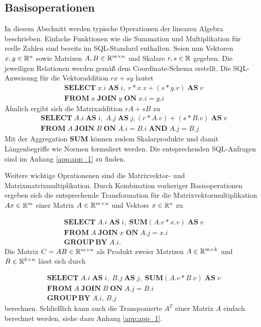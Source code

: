 \subsection*{Basisoperationen}
\label{abs_basisoperationen}
In diesem Abschnitt werden typische Operationen der linearen Algebra beschrieben. Einfache Funktionen wie die Summation und Multiplikation für reelle Zahlen sind bereits im SQL-Standard\cite{DBLP:books/daglib/0067064} enthalten. Seien nun Vektoren $x,y \in \mathbb{R}^n$ sowie Matrizen $A,B \in \mathbb{R}^{m \times n}$ und Skalare $r,s \in \mathbb{R}$ gegeben. Die jeweiligen Relationen werden gemäß dem Coordinate-Schema erstellt. Die SQL-Anweisung für die Vektoraddition $rx+sy$ lautet
\begin{align*}
    & \mathbf{SELECT} \; x.i \; \mathbf{AS} \; i, \; r*x.v+(s*y.v ) \; \mathbf{AS} \; v \\
    & \mathbf{FROM} \; x \; \mathbf{JOIN} \; y \; \mathbf{ON} \; x.i=y.i
\end{align*}
Ähnlich ergibt sich die Matrixaddition $rA+sB$ zu
\begin{align*}
    & \mathbf{SELECT} \; A.i \; \mathbf{AS} \; i, \; A.j \; \mathbf{AS} \; j, (r*A.v)+(s*B.v ) \; \mathbf{AS} \; v \\
    & \mathbf{FROM} \; A \; \mathbf{JOIN} \; B \; \mathbf{ON} \; A.i=B.i \; \mathbf{AND} \; A.j=B.j
\end{align*} 
Mit der Aggregation \textbf{SUM} können zudem Skalarprodukte und damit Längenbegriffe wie Normen formuliert werden. Die entsprechenden SQL-Anfragen sind im Anhang \ref{app:app_1} zu finden. 

Weitere wichtige Oprationenen sind die Matrixvektor- und Matrixmatrixmultiplikation. 
Durch Kombination vorheriger Basisoperationen ergeben sich die entsprechende Transformation für die Matrixvektormultiplikation $Ax \in \mathbb{R}^m$ einer Matrix $A \in \mathbb{R}^{m \times n}$ und Vektors $x \in \mathbb{R}^n$ zu

\begin{align*}
    & \mathbf{SELECT} \; A.i \; \mathbf{AS} \; i, \; \mathbf{SUM} (A.v*x.v) \; \mathbf{AS} \; v\\
    & \mathbf{FROM} \; A \; \mathbf{JOIN} \; x \; \mathbf{ON} \; A.j=x.i \; \\
    & \mathbf{GROUP} \, \mathbf{BY} \; A.i.
\end{align*}
Die Matrix $C=AB \in \mathbb{R}^{m \times n}$ als Produkt zweier Matrizen $A \in \mathbb{R}^{m \times k}$ und $B \in \mathbb{R}^{k \times n}$ lässt sich durch

\begin{align*}
    & \mathbf{SELECT} \; A.i \; \mathbf{AS} \; i, \; B.j \; \mathbf{AS} \; j, \; \mathbf{SUM} (A.v*B.v) \; \mathbf{AS} \; v\\
    & \mathbf{FROM} \; A \; \mathbf{JOIN} \; B \; \mathbf{ON} \; A.j=B.i \; \\
    & \mathbf{GROUP} \, \mathbf{BY} \; A.i, \, B.j
\end{align*}
berechnen.
Schließlich kann auch die Transponierte $A^T$ einer Matrix $A$ einfach berechnet werden, siehe dazu Anhang \ref{app:app_1}.

